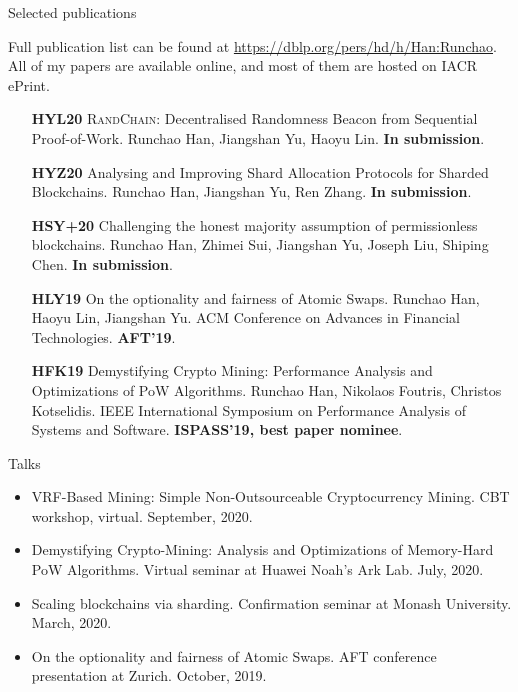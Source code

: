 \documentclass{resume} %
\begin{document}


\begin{rSection}{Selected publications} 

Full publication list can be found at \url{https://dblp.org/pers/hd/h/Han:Runchao}.
All of my papers are available online, and most of them are hosted on IACR ePrint.

\begin{itemize}
    \item[\bf HYL20] \textsc{RandChain}: Decentralised Randomness Beacon from Sequential Proof-of-Work. Runchao Han, Jiangshan Yu, Haoyu Lin. \textbf{In submission}.
    \item[\bf HYZ20] Analysing and Improving Shard Allocation Protocols for Sharded Blockchains. Runchao Han, Jiangshan Yu, Ren Zhang. \textbf{In submission}.
    \item[\bf HSY+20] Challenging the honest majority assumption of permissionless blockchains. Runchao Han, Zhimei Sui, Jiangshan Yu, Joseph Liu, Shiping Chen.  \textbf{In submission}.
    \item[\bf HLY19] On the optionality and fairness of Atomic Swaps. Runchao Han, Haoyu Lin, Jiangshan Yu.  ACM Conference on Advances in Financial Technologies. \textbf{AFT'19}.
    \item[\bf HFK19] Demystifying Crypto Mining: Performance Analysis and Optimizations of PoW Algorithms. Runchao Han, Nikolaos Foutris, Christos Kotselidis. IEEE International Symposium on Performance Analysis of Systems and Software. \textbf{ISPASS'19, best paper nominee}.
\end{itemize}

\end{rSection}

\begin{rSection}{Talks}
\begin{itemize}
    \item VRF-Based Mining: Simple Non-Outsourceable Cryptocurrency Mining. CBT workshop, virtual. September, 2020.
    \item Demystifying Crypto-Mining: Analysis and Optimizations of Memory-Hard PoW Algorithms. Virtual seminar at Huawei Noah's Ark Lab. July, 2020.
    \item Scaling blockchains via sharding. Confirmation seminar at Monash University. March, 2020.
    \item On the optionality and fairness of Atomic Swaps. AFT conference presentation at Zurich. October, 2019.
\end{itemize}
\end{rSection}
\end{document}
